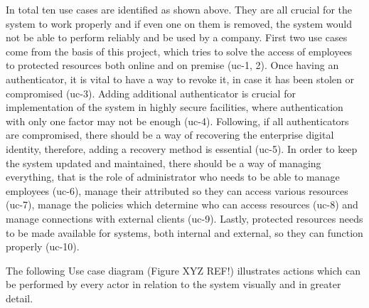 In total ten use cases are identified as shown above. They are all crucial for the system to work properly and if even one on them is removed, the system would not be able to perform reliably and be used by a company. First two use cases come from the basis of this project, which tries to solve the access of employees to protected resources both online and on premise (\acrshort{uc}-1, 2). Once having an authenticator, it is vital to have a way to revoke it, in case it has been stolen or compromised (\acrshort{uc}-3). Adding additional authenticator is crucial for implementation of the system in highly secure facilities, where authentication with only one factor may not be enough (\acrshort{uc}-4). Following, if all authenticators are compromised, there should be a way of recovering the enterprise digital identity, therefore, adding a recovery method is essential (\acrshort{uc}-5). In order to keep the system updated and maintained, there should be a way of managing everything, that is the role of administrator who needs to be able to manage employees (\acrshort{uc}-6), manage their attributed so they can access various resources (\acrshort{uc}-7), manage the policies which determine who can access resources (\acrshort{uc}-8) and manage connections with external clients (\acrshort{uc}-9). Lastly, protected resources needs to be made available for systems, both internal and external, so they can function properly (\acrshort{uc}-10).

The following Use case diagram (Figure XYZ REF!) illustrates actions which can be performed by every actor in relation to the system visually and in greater detail.  